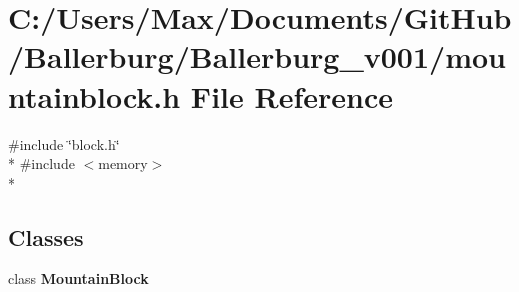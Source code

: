 \section{C\+:/\+Users/\+Max/\+Documents/\+Git\+Hub/\+Ballerburg/\+Ballerburg\+\_\+v001/mountainblock.h File Reference}
\label{mountainblock_8h}
{\ttfamily \#include \char`\"{}block.\+h\char`\"{}}\\*
{\ttfamily \#include $<$memory$>$}\\*
\subsection*{Classes}
\begin{DoxyCompactItemize}
\item 
class {\bf Mountain\+Block}
\end{DoxyCompactItemize}
